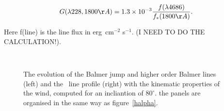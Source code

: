 \documentclass[preprint, a4paper, 11pt]{aastex}
\begin{document}
\begin{equation}
G (\lambda228, 1800 \AA) = 1.3\times 10^{-3} \frac{f(\lambda4686)}{f_*(1800\AA)}.\\
\end{equation}

Here f(line) is the line flux in erg~cm$^{-2}$ s$^{-1}$. (I NEED TO DO THE CALCULATION!).




\begin{figure} %
\mbox{
\quad
{}   
}
\caption{The evolution of the Balmer jump and higher order Balmer lines (left) 
and the \civ\ line profile (right)
with the kinematic properties of the wind,
computed for an incliantion of $80^\circ$. 
the panels are organised in the same way as figure~\ref{halpha}.
}
\label{jump}
\end{figure}
\end{document}

